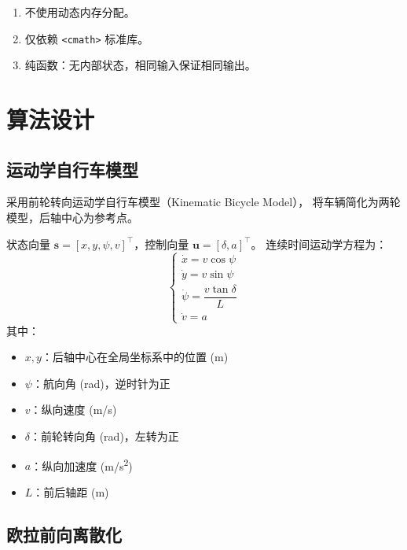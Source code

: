\documentclass[a4paper,10pt]{article}
\begin{document}
\begin{enumerate}[label=NFR-\arabic*]
  \item 不使用动态内存分配。
  \item 仅依赖 \texttt{<cmath>} 标准库。
  \item 纯函数：无内部状态，相同输入保证相同输出。
\end{enumerate}

\section{算法设计}

\subsection{运动学自行车模型}

采用前轮转向运动学自行车模型（Kinematic Bicycle Model），
将车辆简化为两轮模型，后轴中心为参考点。

状态向量 $\mathbf{s} = [x, y, \psi, v]^{\!\top}$，控制向量 $\mathbf{u} = [\delta, a]^{\!\top}$。
连续时间运动学方程为：
\begin{equation}
  \begin{cases}
    \dot{x} = v \cos\psi \\[4pt]
    \dot{y} = v \sin\psi \\[4pt]
    \dot{\psi} = \dfrac{v \tan\delta}{L} \\[6pt]
    \dot{v} = a
  \end{cases}
\end{equation}
其中：
\begin{itemize}
  \item $x, y$：后轴中心在全局坐标系中的位置 (m)
  \item $\psi$：航向角 (rad)，逆时针为正
  \item $v$：纵向速度 (m/s)
  \item $\delta$：前轮转向角 (rad)，左转为正
  \item $a$：纵向加速度 (m/s\textsuperscript{2})
  \item $L$：前后轴距 (m)
\end{itemize}

\subsection{欧拉前向离散化}
\end{document}
